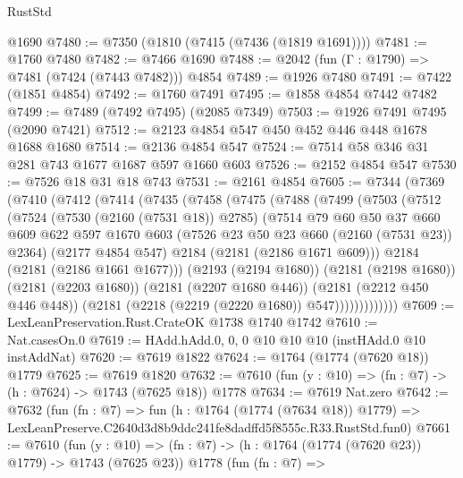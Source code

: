 \begin{lexlean}{RustStd}
\begin{coremodule}
    @1690
@7480 := @7350 (@1810 (@7415 (@7436 (@1819 @1691))))
@7481 := @1760 @7480
@7482 := @7466 @1690
@7488 := @2042 (fun (Γ : @1790) => @7481 (@7424 (@7443 @7482))) @4854
@7489 := @1926 @7480
@7491 := @7422 (@1851 @4854)
@7492 := @1760 @7491
@7495 := @1858 @4854 @7442 @7482
@7499 := @7489 (@7492 @7495) (@2085 @7349)
@7503 := @1926 @7491 @7495 (@2090 @7421)
@7512 := @2123 @4854 @547 @450 @452 @446 @448 @1678 @1688 @1680
@7514 := @2136 @4854 @547
@7524 := @7514 @58 @346 @31 @281 @743 @1677 @1687 @597 @1660 @603
@7526 := @2152 @4854 @547
@7530 := @7526 @18 @31 @18 @743
@7531 := @2161 @4854
@7605 := @7344
    (@7369
      (@7410
        (@7412
          (@7414
            (@7435
              (@7458
                (@7475
                  (@7488
                    (@7499
                      (@7503
                        (@7512
                          (@7524
                            (@7530 (@2160 (@7531 @18)) @2785)
                            (@7514
                              @79
                              @60
                              @50
                              @37
                              @660
                              @609
                              @622
                              @597
                              @1670
                              @603
                              (@7526 @23 @50 @23 @660 (@2160 (@7531 @23)) @2364)
                              (@2177 @4854 @547)
                              @2184
                              (@2181 (@2186 @1671 @609)))
                            @2184
                            (@2181 (@2186 @1661 @1677)))
                          (@2193 (@2194 @1680))
                          (@2181 (@2198 @1680))
                          (@2181 (@2203 @1680))
                          (@2181 (@2207 @1680 @446))
                          (@2181 (@2212 @450 @446 @448))
                          (@2181 (@2218 (@2219 (@2220 @1680)) @547)))))))))))))
@7609 := LexLeanPreservation.Rust.CrateOK @1738 @1740 @1742
@7610 := Nat.casesOn.{0}
@7619 := HAdd.hAdd.{0, 0, 0} @10 @10 @10 (instHAdd.{0} @10 instAddNat)
@7620 := @7619 @1822
@7624 := @1764 (@1774 (@7620 @18)) @1779
@7625 := @7619 @1820
@7632 := @7610 (fun (y : @10) => (fn : @7) -> (h : @7624) -> @1743 (@7625 @18)) @1778
@7634 := @7619 Nat.zero
@7642 := @7632
    (fun (fn : @7) =>
    fun (h : @1764 (@1774 (@7634 @18)) @1779) =>
    LexLeanPreserve.C2640d3d8b9ddc241fe8dadffd5f8555c.R33.RustStd.fun0)
@7661 := @7610
    (fun (y : @10) => (fn : @7) -> (h : @1764 (@1774 (@7620 @23)) @1779) -> @1743 (@7625 @23))
    @1778
    (fun (fn : @7) =>

\end{coremodule}
\end{lexlean}

